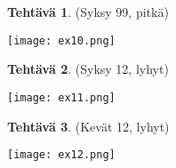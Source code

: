 \documentclass[12pt,leqno,a4paper,oneside]{amsart}
\theoremstyle{definition}
\newtheorem{exercise}{Tehtävä}
\theoremstyle{remark}
\numberwithin{equation}{section}
\begin{document}
\begin{exercise}
 (Syksy 99, pitkä)
 
 \texttt{[image: ex10.png]}
\end{exercise}

\begin{exercise}
 (Syksy 12, lyhyt)
 
 \texttt{[image: ex11.png]}
\end{exercise}

\begin{exercise}
 (Kevät 12, lyhyt)
 
 \texttt{[image: ex12.png]}
\end{exercise}


\end{document}

